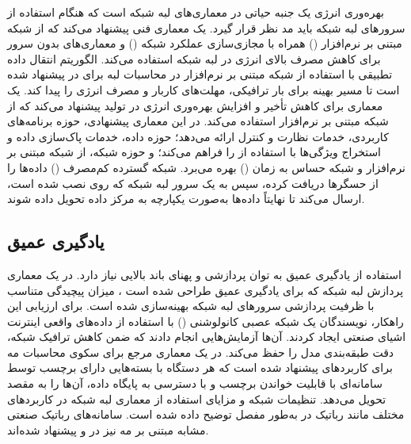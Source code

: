 بهره‌وری انرژی یک جنبه حیاتی در معماری‌های لبه شبکه است که هنگام استفاده از سرورهای لبه شبکه باید مد نظر قرار گیرد. \cite{djemame2021energy} یک معماری فنی پیشنهاد می‌کند که از شبکه مبتنی بر نرم‌افزار () همراه با مجازی‌سازی عملکرد شبکه ()  و معماری‌های بدون سرور برای کاهش مصرف بالای انرژی در لبه شبکه استفاده می‌کند. الگوریتم انتقال داده تطبیقی با استفاده از شبکه مبتنی بر نرم‌افزار در محاسبات لبه برای  در \cite{li2018adaptive} پیشنهاد شده است تا مسیر بهینه برای بار ترافیکی، مهلت‌های کاربار و مصرف انرژی را پیدا کند. \cite{chalapathi2021iioT} یک معماری برای کاهش تأخیر و افزایش بهره‌وری انرژی در تولید پیشنهاد می‌کند که از شبکه مبتنی بر نرم‌افزار استفاده می‌کند. در این معماری پیشنهادی، حوزه برنامه‌های کاربردی، خدمات نظارت و کنترل ارائه می‌دهد؛ حوزه داده، خدمات پاک‌سازی داده و استخراج ویژگی‌ها با استفاده از  را فراهم می‌کند؛ و حوزه شبکه، از شبکه مبتنی بر نرم‌افزار و شبکه حساس به زمان () بهره می‌برد. شبکه گسترده کم‌مصرف () داده‌ها را از حسگرها دریافت کرده، سپس به یک سرور لبه شبکه که  روی  نصب شده است، ارسال می‌کند تا نهایتاً داده‌ها به‌صورت یکپارچه به مرکز داده تحویل داده شوند.

\subsection{یادگیری عمیق}

استفاده از یادگیری عمیق به توان پردازشی و پهنای باند بالایی نیاز دارد. در یک معماری پردازش لبه‌ شبکه که برای یادگیری عمیق طراحی شده است \cite{liang2020edge}، میزان پیچیدگی متناسب با ظرفیت پردازشی سرور‌های لبه‌ شبکه بهینه‌سازی شده است. برای ارزیابی این راهکار، نویسندگان یک شبکه عصبی کانولوشنی () با استفاده از داده‌های واقعی اینترنت اشیای صنعتی ایجاد کردند. آن‌ها آزمایش‌هایی انجام دادند که ضمن کاهش ترافیک شبکه، دقت طبقه‌بندی مدل را حفظ می‌کند. در \cite{pop2021fora} یک معماری مرجع برای سکوی محاسبات مه برای کاربردهای  پیشنهاد شده است که هر دستگاه با بسته‌هایی دارای برچسب‌ توسط سامانه‌ای با قابلیت خواندن برچسب و با دسترسی به پایگاه داده، آن‌ها را به مقصد تحویل می‌دهد. تنظیمات شبکه و مزایای استفاده از معماری لبه شبکه در کاربردهای مختلف مانند رباتیک در \cite{barzegaran2020fogification} به‌طور مفصل توضیح داده شده است. سامانه‌های رباتیک صنعتی مشابه مبتنی بر مه نیز در \cite{shaik2020fog} و \cite{denzler2020consolidating} پیشنهاد شده‌اند.

